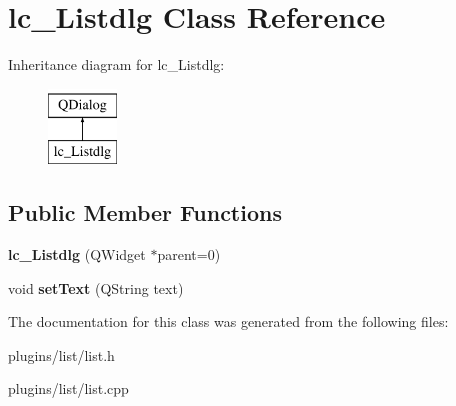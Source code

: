 \hypertarget{classlc__Listdlg}{\section{lc\-\_\-\-Listdlg Class Reference}
\label{classlc__Listdlg}
}
Inheritance diagram for lc\-\_\-\-Listdlg\-:\begin{figure}[H]
\begin{center}
\leavevmode
\includegraphics[height=2.000000cm]{classlc__Listdlg}
\end{center}
\end{figure}
\subsection*{Public Member Functions}
\begin{DoxyCompactItemize}
\item 
\hypertarget{classlc__Listdlg_a1edf1ed44e61dbe844fd8f8add5d899f}{{\bfseries lc\-\_\-\-Listdlg} (Q\-Widget $\ast$parent=0)}\label{classlc__Listdlg_a1edf1ed44e61dbe844fd8f8add5d899f}

\item 
\hypertarget{classlc__Listdlg_a2a76150a89e7609725f68d365ef38cf3}{void {\bfseries set\-Text} (Q\-String text)}\label{classlc__Listdlg_a2a76150a89e7609725f68d365ef38cf3}

\end{DoxyCompactItemize}


The documentation for this class was generated from the following files\-:\begin{DoxyCompactItemize}
\item 
plugins/list/list.\-h\item 
plugins/list/list.\-cpp\end{DoxyCompactItemize}
